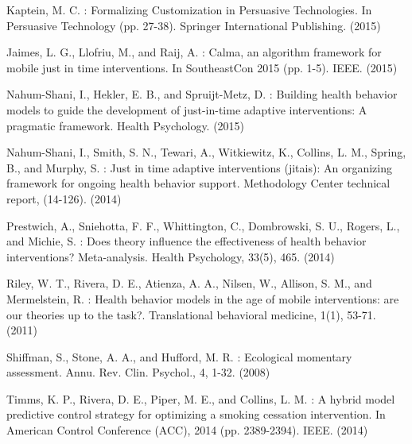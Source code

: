\documentclass[runningheads,a4paper]{llncs}
\begin{document}
\begin{thebibliography}{4}
 Kaptein, M. C. : Formalizing Customization in Persuasive Technologies. In Persuasive Technology (pp. 27-38). Springer International Publishing. (2015)

 Jaimes, L. G., Llofriu, M., and Raij, A. : Calma, an algorithm framework for mobile just in time interventions. In SoutheastCon 2015 (pp. 1-5). IEEE. (2015)

 Nahum-Shani, I., Hekler, E. B., and Spruijt-Metz, D. : Building health behavior models to guide the development of just-in-time adaptive interventions: A pragmatic framework. Health Psychology. (2015)

 Nahum-Shani, I., Smith, S. N., Tewari, A., Witkiewitz, K., Collins, L. M., Spring, B., and Murphy, S. : Just in time adaptive interventions (jitais): An organizing framework for ongoing health behavior support. Methodology Center technical report, (14-126). (2014)

 Prestwich, A., Sniehotta, F. F., Whittington, C., Dombrowski, S. U., Rogers, L., and Michie, S. : Does theory influence the effectiveness of health behavior interventions? Meta-analysis. Health Psychology, 33(5), 465. (2014)

 Riley, W. T., Rivera, D. E., Atienza, A. A., Nilsen, W., Allison, S. M., and Mermelstein, R. : Health behavior models in the age of mobile interventions: are our theories up to the task?. Translational behavioral medicine, 1(1), 53-71. (2011)

 Shiffman, S., Stone, A. A., and Hufford, M. R. : Ecological momentary assessment. Annu. Rev. Clin. Psychol., 4, 1-32. (2008)

 Timms, K. P., Rivera, D. E., Piper, M. E., and Collins, L. M. : A hybrid model predictive control strategy for optimizing a smoking cessation intervention. In American Control Conference (ACC), 2014 (pp. 2389-2394). IEEE. (2014)




\end{thebibliography}
\end{document}
